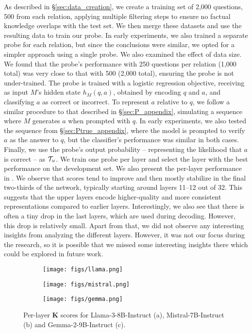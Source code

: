 As described in \S \ref{sec:data_creation}, we create a training set of 2,000 questions, 500 from each relation, applying multiple filtering steps to ensure no factual knowledge overlaps with the test set. We then merge these datasets and use the resulting data to train our probe. In early experiments, we also trained a separate probe for each relation, but since the conclusions were similar, we opted for a simpler approach using a single probe.
We also examined the effect of data size. We found that the probe's performance with 250 questions per relation (1,000 total) was very close to that with 500 (2,000 total), ensuring the probe is not under-trained.
The probe is trained with a logistic regression objective, receiving as input $M$'s hidden state $h_M(q, a)$, obtained by encoding $q$ and $a$, and classifying $a$ as correct or incorrect. To represent $a$ relative to $q$, we follow a similar procedure to that described in \S\ref{sec:P_appendix}, simulating a sequence where $M$ generates $a$ when prompted with $q$. In early experiments, we also tested the sequence from \S\ref{sec:Ptrue_appendix}, where the model is prompted to verify $a$ as the answer to $q$, but the classifier’s performance was similar in both cases.
Finally, we use the probe’s output probability -- representing the likelihood that $a$ is correct -- as $\mathcal{T}_{\text{\tiny \emph{M}}}$. We train one probe per layer and select the layer with the best performance on the development set. We also present the per-layer performance in . We observe that scores tend to improve and then mostly stabilize in the final two-thirds of the network, typically starting around layers 11–12 out of 32. This suggests that the upper layers encode higher-quality and more consistent representations compared to earlier layers. Interestingly, we also see that there is often a tiny drop in the last layers, which are used during decoding. However, this drop is relatively small. Apart from that, we did not observe any interesting insights from analyzing the different layers. However, it was not our focus during the research, so it is possible that we missed some interesting insights there which could be explored in future work.


\begin{figure}[htbp]
  \centering
  \begin{subfigure}[b]{0.32\textwidth}
    \texttt{[image: figs/llama.png]}
    \caption{}
  \end{subfigure}
  \hfill
  \begin{subfigure}[b]{0.32\textwidth}
    \texttt{[image: figs/mistral.png]}
    \caption{}
  \end{subfigure}
  \hfill
  \begin{subfigure}[b]{0.32\textwidth}
    \texttt{[image: figs/gemma.png]}
    \caption{}
  \end{subfigure}
  \caption{Per-layer $\mathbf{K}$ scores for \textsf{Llama-3-8B-Instruct} (a), \textsf{Mistral-7B-Instruct} (b) and \textsf{Gemma-2-9B-Instruct} (c).}
  \label{fig:per-layer}
\end{figure}

